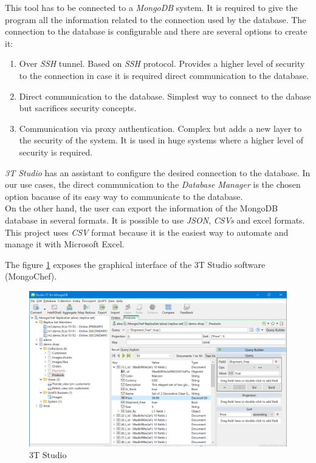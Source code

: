 This tool has to be connected to a \textit{MongoDB} system. It is required to give the program all the information related to the connection used by the database. The connection to the database is configurable and there are several options to create it:

\begin{enumerate}

\item Over \textit{SSH} tunnel. Based on \textit{SSH} protocol. Provides a higher level of security to the connection in case it is required direct communication to the database.
\item Direct communication to the database. Simplest way to connect to the dabase but sacrifices security concepts.
\item Communication via proxy authentication. Complex but adds a new layer to the security of the system. It is used in huge systems where a higher level of security is required.

\end{enumerate}


\textit{3T Studio} has an assistant to configure the desired connection to the database. In our use cases, the direct communication to the \textit{Database Manager} is the chosen option bacause of its easy way to communicate to the database.\\

On the other hand, the user can export the information of the MongoDB database in several formats. It is possible to use \textit{JSON}, \textit{CSVs} and excel formats. This project uses \textit{CSV} format because it is the easiest way to automate and manage it with Microsoft Excel.

The figure \ref{3T_STUDIO} exposes the graphical interface of the 3T Studio software (MongoChef).

\begin{figure}[H]
\begin{centering}
\includegraphics[scale=0.4]{IMGS/3T_STUDIO.png}
\caption{3T Studio \label{3T_STUDIO}}
\end{centering}
\end{figure}

